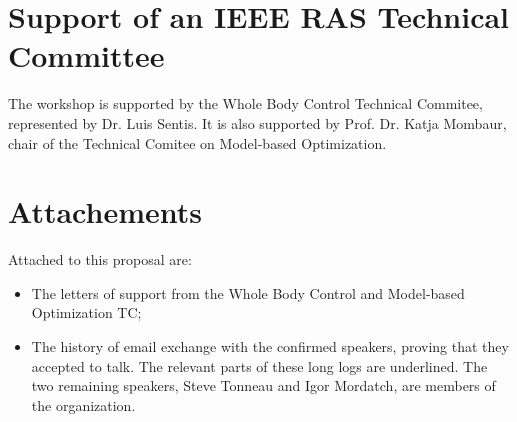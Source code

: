 \documentclass[conference]{IEEEtran}
\begin{document}
\section{Support of an IEEE RAS Technical Committee}
The workshop is supported by the Whole Body Control Technical Commitee, represented by Dr. Luis Sentis.
It is also supported by Prof. Dr. Katja Mombaur, chair of the Technical Comitee on Model-based Optimization.

\section{Attachements}
Attached to this proposal are:
\begin{itemize}
\item The letters of support from the Whole Body Control and Model-based Optimization TC;
\item The history of email exchange with the confirmed speakers, proving that they accepted to talk.
The relevant parts of these long logs are underlined. The two remaining speakers, Steve Tonneau and Igor Mordatch,
are members of the organization.
\end{itemize}










\maketitle




\end{document}
